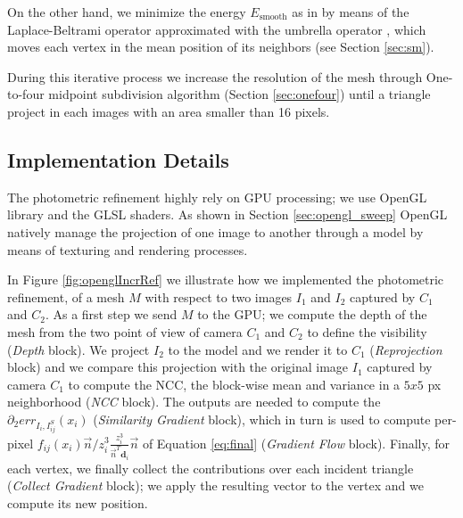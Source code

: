 On the other hand, we minimize the energy $E_{\textrm{smooth}}$ as in \cite{vu_et_al_2012} by means of the Laplace-Beltrami operator approximated with the umbrella operator \cite{wardetzky2007discrete}, which moves each vertex in the mean position of its neighbors (see Section \ref{sec:sm}).

During this iterative process we increase the resolution of the mesh through One-to-four midpoint subdivision algorithm (Section \ref{sec:onefour}) until a triangle project in each images with an area smaller than 16 pixels.


\subsection{Implementation Details}
The photometric refinement highly rely on GPU processing; we use OpenGL library \cite{opengl} and the GLSL shaders. As shown in Section \ref{sec:opengl_sweep} OpenGL natively manage the projection of one image to another through a model by means of texturing and rendering processes.

In Figure \ref{fig:openglIncrRef} we illustrate how we implemented the photometric refinement, of a mesh $\mathit{M}$ with respect to two images $I_{1}$ and $I_{2}$ captured by $C_{1}$ and $C_{2}$.
As a first step we send $\mathit{M}$  to  the GPU; we compute the depth of the mesh from the two point of view of camera $C_{1}$ and $C_{2}$ to define the visibility (\emph{Depth} block).
We project $I_{2}$ to the model and we render it to $C_{1}$ (\emph{Reprojection} block) and we compare this projection with the original image $I_{1}$ captured by camera $C_{1}$ to compute the NCC, the block-wise mean and variance  in a $5x5$ px neighborhood (\emph{NCC} block).
The outputs are needed to compute the $\partial_2 err_{I_i, I_{ij}^{\mathit{S}}}(x_i)$ (\emph{Similarity Gradient} block), which in turn is used to compute per-pixel $f_{ij}(x_i)  \overrightarrow{n}/z_i^3 \frac{z_i^3}{\overrightarrow{n}^T \mathbf{d}_i }\overrightarrow{n}$ of Equation \eqref{eq:final} (\emph{Gradient Flow} block). 
Finally, for each vertex, we finally collect the contributions over each incident triangle (\emph{Collect Gradient} block); we apply the resulting vector to the vertex and we compute its new position.

